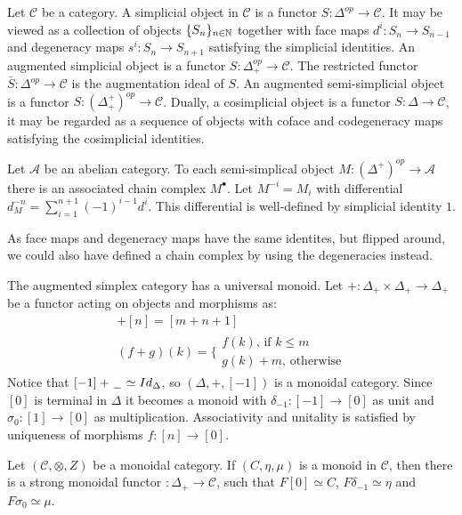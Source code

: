 \documentclass[../thesis.tex]{subfiles}
\begin{document}
            Let $\mathcal{C}$ be a category. A simplicial object in $\mathcal{C}$ is a functor $S:\Delta^{op}\rightarrow \mathcal{C}$. It may be viewed as a collection of objects $\{S_n\}_{n\in\mathbb{N}}$ together with face maps $d^i:S_n\rightarrow S_{n-1}$ and degeneracy maps $s^i:S_n \rightarrow S_{n+1}$ satisfying the simplicial identities. An augmented simplicial object is a functor $S:\Delta_+^{op}\rightarrow \mathcal{C}$. The restricted functor $\bar{S}:\Delta^{op}\rightarrow \mathcal{C}$ is the augmentation ideal of $S$. An augmented semi-simplicial object is a functor $S:(\Delta_+^+)^{op}\rightarrow \mathcal{C}$. Dually, a cosimplicial object is a functor $S:\Delta\rightarrow \mathcal{C}$, it may be regarded as a sequence of objects with coface and codegeneracy maps satisfying the cosimplicial identities.
            
            Let $\mathcal{A}$ be an abelian category. To each semi-simplical object $M:(\Delta^+)^{op}\rightarrow \mathcal{A}$ there is an associated chain complex $M^\bullet$. Let $M^{-i} = M_i$ with differential $d_M^{-n} = \sum_{i=1}^{n+1} (-1)^{i-1}d^i$. This differential is well-defined by simplicial identity $1$.
            \begin{center}
            \end{center}
            As face maps and degeneracy maps have the same identites, but flipped around, we could also have defined a chain complex by using the degeneracies instead.

            The augmented simplex category has a universal monoid. Let $+:\Delta_+ \times \Delta_+ \rightarrow \Delta_+$ be a functor acting on objects and morphisms as:
            \begin{align*}
                [m]+[n] = [m+n+1] \\
                (f+g)(k) = \biggl\{\substack{f(k)\text{, if }k\leq m \\ g(k)+m\text{, otherwise}}
            \end{align*}
            Notice that $[-1]+\hspace{0.05cm}\underline{\hspace{0.2cm}}\hspace{0.05cm}\simeq Id_\Delta$, so $(\Delta, +, [-1])$ is a monoidal category. Since $[0]$ is terminal in $\Delta$ it becomes a monoid with $\delta_{-1}: [-1]\rightarrow [0]$ as unit and $\sigma_0:[1]\rightarrow [0]$ as multiplication. Associativity and unitality is satisfied by uniqueness of morphisms $f:[n]\rightarrow [0]$.
            \begin{proposition}\label{prop: universal-monoid}
                Let $(\mathcal{C}, \otimes, Z)$ be a monoidal category. If $(C, \eta, \mu)$ is a monoid in $\mathcal{C}$, then there is a strong monoidal functor $:\Delta_+\rightarrow \mathcal{C}$, such that $F[0] \simeq C$, $F\delta_{-1} \simeq \eta$ and $F\sigma_0 \simeq \mu$.
            \end{proposition} 
\end{document}
